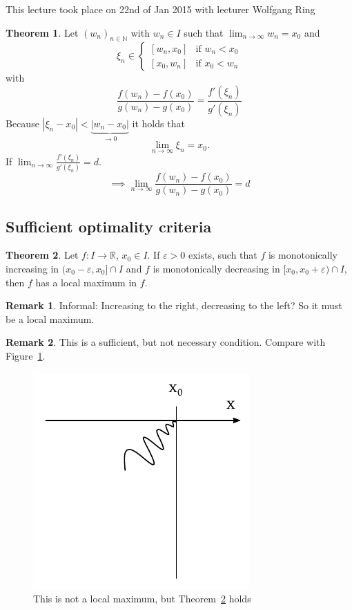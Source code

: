 \documentclass[a4paper,landscape,twocolumn]{article}
\theoremstyle{definition}
\newtheorem{theorem}{Theorem}
\newtheorem{rem}{Remark}
\newcommand\abs[1]{\left|#1\right|}
\newcommand\meta[3]{\begin{mdframed}[skipbelow=4pt,skipabove=4pt,innermargin=1pt,innerleftmargin=1pt,innerrightmargin=1pt]\begin{center}\small{\textdownarrow{} This #1 took place on #2 with lecturer #3}\end{center}\end{mdframed}}
\begin{document}
\meta{lecture}{22nd of Jan 2015}{Wolfgang Ring}

\begin{theorem}
  Let $(w_n)_{n \in \mathbb N}$ with $w_n \in I$ such that $\lim_{n\to\infty} w_n = x_0$
  and
  \[
    \xi_n \in \begin{cases}
      [w_n, x_0] & \text{if } w_n < x_0 \\
      [x_0, w_n] & \text{if } x_0 < w_n
    \end{cases}
  \]
  with \[ \frac{f(w_n) - f(x_0)}{g(w_n) - g(x_0)} = \frac{f'(\xi_n)}{g'(\xi_n)} \]
  Because $\abs{\xi_n - x_0} < \underbrace{\abs{w_n - x_0}}_{\to 0}$ it holds that
  \[ \lim_{n\to\infty} \xi_n = x_0. \]
  If $\lim_{n\to\infty} \frac{f'(\xi_n)}{g'(\xi_n)} = d$.
  \[ \implies \lim_{n\to\infty} \frac{f(w_n) - f(x_0)}{g(w_n) - g(x_0)} = d \]
\end{theorem}

\subsection{Sufficient optimality criteria}
%
\begin{theorem}
  \label{thm:suff-opt-crit}
  Let $f: I \to \mathbb R$, $x_0 \in I$. If $\varepsilon > 0$ exists, such that
  $f$ is monotonically increasing in $(x_0 - \varepsilon, x_0] \cap I$ and
  $f$ is monotonically decreasing in $[x_0, x_0 + \varepsilon) \cap I$,
  then $f$ has a local maximum in $f$.
\end{theorem}
\begin{rem}
  Informal: Increasing to the right, decreasing to the left? So it must be
  a local maximum.
\end{rem}
\begin{rem}
  This is a sufficient, but not necessary condition.
  Compare with Figure~\ref{counterexample}.
\end{rem}

\begin{figure}[!h]
  \begin{center}
    \includegraphics{img/counterexample_maximum.pdf}
    \caption{This is not a local maximum, but Theorem~\ref{thm:suff-opt-crit} holds}
    \label{counterexample}
  \end{center}
\end{figure}
\end{document}
